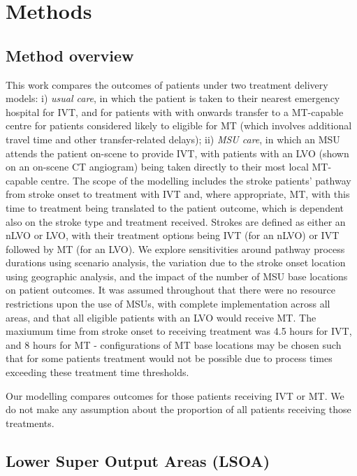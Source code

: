 \section{Methods}

\subsection{Method overview}

This work compares the outcomes of patients under two treatment delivery models: i) \emph{usual care}, in which the patient is taken to their nearest emergency hospital for IVT, and for patients with with onwards transfer to a MT-capable centre for patients considered likely to eligible for MT (which involves additional travel time and other transfer-related delays); ii) \textit{MSU care}, in which an MSU attends the patient on-scene to provide IVT, with patients with an LVO (shown on an on-scene CT angiogram) being taken directly to their most local MT-capable centre. The scope of the modelling includes the stroke patients’ pathway from stroke onset to treatment with IVT and, where appropriate, MT, with this time to treatment being translated to the patient outcome, which is dependent also on the stroke type and treatment received. Strokes are defined as either an nLVO or LVO, with their treatment options being IVT (for an nLVO) or IVT followed by MT (for an LVO). We explore sensitivities around pathway process durations using scenario analysis, the variation due to the stroke onset location using geographic analysis, and the impact of the number of MSU base locations on patient outcomes. It was assumed throughout that there were no resource restrictions upon the use of MSUs, with complete implementation across all areas, and that all eligible patients with an LVO would receive MT. The maxiumum time from stroke onset to receiving treatment was 4.5 hours for IVT, and 8 hours for MT - configurations of MT base locations may be chosen such that for some patients treatment would not be possible due to process times exceeding these treatment time thresholds.

Our modelling compares outcomes for those patients receiving IVT or MT. We do not make any assumption about the proportion of all patients receiving those treatments.

\subsection{Lower Super Output Areas (LSOA)}

